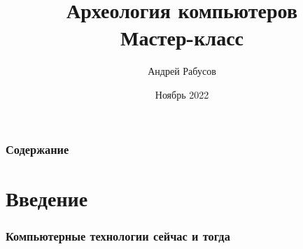 \documentclass[t,aspectratio=169]{beamer}
\author{Андрей Рабусов}
\date{Ноябрь 2022}
\title{Археология компьютеров\\
Мастер-класс}
\begin{document}
\begin{frame}
    \frametitle{Содержание}
    \tableofcontents[sectionstyle=show,subsectionstyle=show]
\end{frame}

\section{Введение}
\begin{frame}
    \frametitle{Компьютерные технологии сейчас и тогда}
\end{frame}
\end{document}
